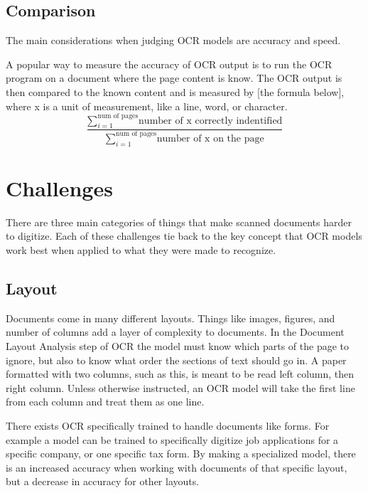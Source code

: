 \documentclass[sigplan,screen,nonacm]{acmart-tagged}
\begin{document}
\subsection{Comparison}
\label{comparison}

The main considerations when judging OCR models are accuracy and speed.\cite{Raj:2022} 


A popular way to measure the accuracy of OCR output is to run the OCR program on a document where the page content is know. The OCR output is then compared to the known content and is measured by [the formula below], where x is a unit of measurement, like a line, word, or character.
\[
\dfrac{\sum\limits_{i=1}^\text{num of pages}\text{number of x correctly indentified}}{\sum\limits_{i=1}^\text{num of pages}\text{number of x on the page}}
\]


\section{Challenges}
\label{sec:body}

There are three main categories of things that make scanned documents harder to digitize. Each of these challenges tie back to the key concept that OCR models work best when applied to what they were made to recognize.

\subsection{Layout}
\label{Layout}

Documents come in many different layouts. Things like images, figures, and number of columns add a layer of complexity to documents. 
In the Document Layout Analysis step of OCR the model must know which parts of the page to ignore, but also to know what order the sections of text should go in.
A paper formatted with two columns, such as this, is meant to be read left column, then right column. Unless otherwise instructed, an OCR model will take the first line from each column and treat them as one line. 

There exists OCR specifically trained to handle documents like forms. For example a model can be trained to specifically digitize job applications for a specific company, or one specific tax form. By making a specialized  model, there is an increased accuracy when working with documents of that specific layout, but a decrease in accuracy for other layouts. 
\end{document}
